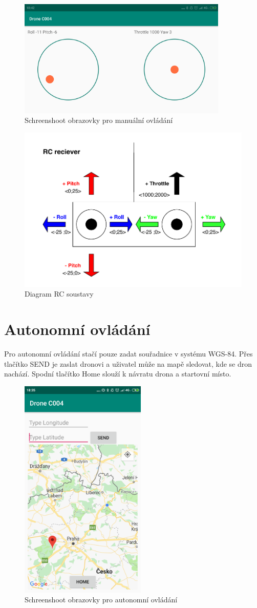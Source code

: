 \begin{figure}[h]
	\centering
	\includegraphics[width=10cm]{pictures/app.png}
	\caption{Schreenshoot obrazovky pro manuální ovládání}
\end{figure}

\begin{figure}[h]
	\centering
	\includegraphics[width=14cm]{pictures/rcDiagram.pdf}
	\caption{Diagram RC soustavy}
\end{figure}

\section{Autonomní ovládání} 
Pro autonomní ovládání stačí pouze zadat souřadnice v systému WGS-84. Přes tlačítko SEND je zaslat dronovi a uživatel může na mapě sledovat, kde se dron nachází. Spodní tlačítko Home slouží k návratu drona a startovní místo.

\begin{figure}[h]
	\centering
	\includegraphics[width=6cm]{pictures/app2.png}
	\caption{Schreenshoot obrazovky pro autonomní ovládání}
\end{figure}

